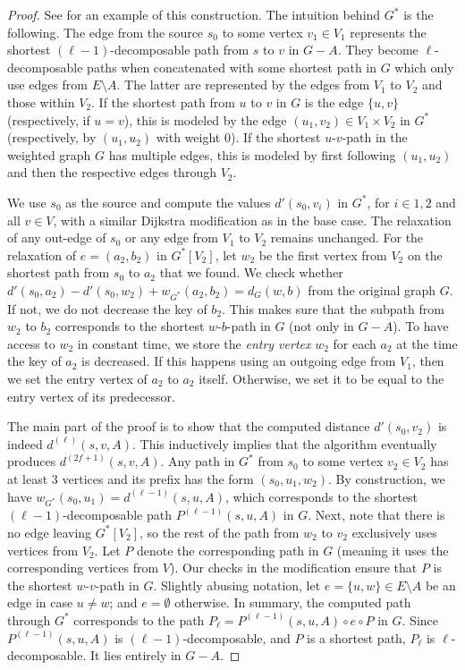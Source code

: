 \documentclass{article}\usepackage[a4paper,margin=20mm]{geometry}
\begin{document}
\begin{proof}
See  for an example of this construction.
The intuition behind $G^*$ is the following.
The edge from the source $s_0$ to some vertex $v_1 \in V_1$ represents the shortest $(\ell{-}1)$-decomposable path from $s$ to $v$ in $G{-}A$.
They become $\ell$-decomposable paths when concatenated with some shortest path in $G$ which only use edges from $E{\setminus}A$.
The latter are represented by the edges from $V_1$ to $V_2$ and those within $V_2$.
If the shortest path from $u$ to $v$ in $G$ is the edge $\{u,v\}$ (respectively, if $u = v$),
this is modeled by the edge $(u_1,v_2) \in V_1 \times V_2$ in $G^*$(respectively, by $(u_1,u_2)$ with weight $0$).
If the shortest $u$-$v$-path in the weighted graph $G$ has multiple edges, 
this is modeled by first following $(u_1,u_2)$ and then the respective edges through $V_2$.

We use $s_0$ as the source and compute the values $d'(s_0,v_i)$ in $G^*$, for $i \in {1,2}$ and all $v \in V$,
with a similar Dijkstra modification as in the base case.
The relaxation of any out-edge of $s_0$ or any edge from $V_1$ to $V_2$ remains unchanged.
For the relaxation of  $e = (a_2,b_2)$ in $G^*[V_2]$,
let $w_2$ be the first vertex from $V_2$ on the shortest path from $s_0$ to $a_2$ that we found. 
We check whether $d'(s_0, a_2) - d'(s_0, w_2) + w_{G^*}(a_2,b_2) = d_G(w,b)$
from the original graph $G$.
If not, we do not decrease the key of $b_2$.
This makes sure that the subpath from $w_2$ to $b_2$
corresponds to the shortest $w$-$b$-path in $G$ (not only in $G-A$).
To have access to $w_2$ in constant time, we store the \emph{entry vertex} $w_2$ for each $a_2$ at the time the key of $a_2$ is decreased.
If this happens using an outgoing edge from $V_1$, then we set the entry vertex of $a_2$ to $a_2$ itself.
Otherwise, we set it to be equal to the entry vertex of its predecessor.

The main part of the proof is to show that the computed distance $d'(s_0,v_2)$ 
is indeed $d^{(\ell)}(s, v, A)$.
This inductively implies that the algorithm eventually produces $d^{(2f+1)}(s,v,A)$.
%
Any path in $G^*$ from $s_0$ to some vertex $v_2 \in V_2$ has at least $3$ vertices
and its prefix has the form $(s_0, u_1, w_2)$.
By construction, we have $w_{G^*}(s_0,u_1)=d^{(\ell-1)}(s, u, A)$,
which corresponds to the shortest $(\ell{-}1)$-de\-com\-pos\-able path $P^{(\ell-1)}(s,u,A)$ in $G$.
Next, note that there is no edge leaving $G^*[V_2]$,
so the rest of the path from $w_2$ to $v_2$ exclusively uses vertices from $V_2$.
Let $P$ denote the corresponding path in $G$ (meaning it uses the corresponding vertices from $V$).
Our checks in the modification ensure that $P$ is the shortest $w$-$v$-path in $G$.
Slightly abusing notation, let $e  = \{u,w\} \in E{\setminus}A$ be an edge in case $u \neq w$;
and $e = \emptyset$ otherwise.
In summary, the computed path through $G^*$
corresponds to the path $P_{\ell} = P^{(\ell-1)}(s, u, A) \circ e \circ P$ in $G$.
Since $P^{(\ell-1)}(s, u, A)$ is $(\ell{-}1)$-decomposable, and $P$ is a shortest path,
$P_{\ell}$ is $\ell$-decomposable.
It lies entirely in $G{-}A$.


\end{proof}
\end{document}
